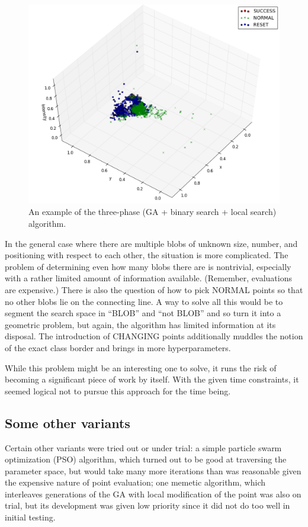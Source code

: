 \documentclass[times, utf8, diplomski]{fer}
\begin{document}
\begin{figure}[htbp]
    \centering
    \includegraphics[width=\textwidth]{images/GA-binary-local.png}
    \caption{An example of the three-phase (GA + binary search + local search)
             algorithm.
    }
    \label{fig:three-phase-example}
\end{figure}


In the general case where there are multiple blobs of unknown size, number,
and positioning with respect to each other, the situation is more complicated.
The problem of determining even how many blobs there are is nontrivial,
especially with a rather limited amount of information available. (Remember,
evaluations are expensive.) There is also the question of how to pick NORMAL
points so that no other blobs lie on the connecting line. A way to solve all
this would be to segment the search space in ``BLOB'' and ``not BLOB'' and so turn
it into a geometric problem, but again, the algorithm has limited information
at its disposal. The introduction of CHANGING points additionally muddles the
notion of the exact class border and brings in more hyperparameters. 

While this problem might be an interesting one to solve, it runs the risk of
becoming a significant piece of work by itself. With the given time constraints,
it seemed logical not to pursue this approach for the time being.


\subsection{Some other variants}
Certain other variants were tried out or under trial: a simple particle swarm
optimization (PSO) algorithm, which turned out to be good at traversing the
parameter space, but would take many more iterations than was reasonable given
the expensive nature of point evaluation; one memetic algorithm, which interleaves
generations of the GA with local modification of the point was also on trial, but
its development was given low priority since it did not do too well in initial
testing.
\end{document}
